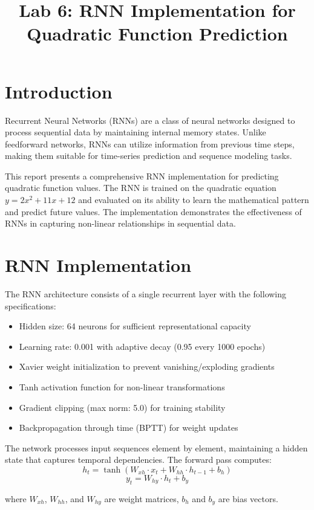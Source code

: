 \documentclass[11pt,a4paper]{article}
\title{Lab 6: RNN Implementation for Quadratic Function Prediction}
\author{}
\date{}
\begin{document}
\maketitle

\section{Introduction}

Recurrent Neural Networks (RNNs) are a class of neural networks designed to process sequential data by maintaining internal memory states. Unlike feedforward networks, RNNs can utilize information from previous time steps, making them suitable for time-series prediction and sequence modeling tasks.

This report presents a comprehensive RNN implementation for predicting quadratic function values. The RNN is trained on the quadratic equation $y = 2x^2 + 11x + 12$ and evaluated on its ability to learn the mathematical pattern and predict future values. The implementation demonstrates the effectiveness of RNNs in capturing non-linear relationships in sequential data.

\section{RNN Implementation}

The RNN architecture consists of a single recurrent layer with the following specifications:
\begin{itemize}
\item Hidden size: 64 neurons for sufficient representational capacity
\item Learning rate: 0.001 with adaptive decay (0.95 every 1000 epochs)
\item Xavier weight initialization to prevent vanishing/exploding gradients
\item Tanh activation function for non-linear transformations
\item Gradient clipping (max norm: 5.0) for training stability
\item Backpropagation through time (BPTT) for weight updates
\end{itemize}

The network processes input sequences element by element, maintaining a hidden state that captures temporal dependencies. The forward pass computes:
$$h_t = \tanh(W_{xh} \cdot x_t + W_{hh} \cdot h_{t-1} + b_h)$$
$$y_t = W_{hy} \cdot h_t + b_y$$

where $W_{xh}$, $W_{hh}$, and $W_{hy}$ are weight matrices, $b_h$ and $b_y$ are bias vectors.
\end{document}
